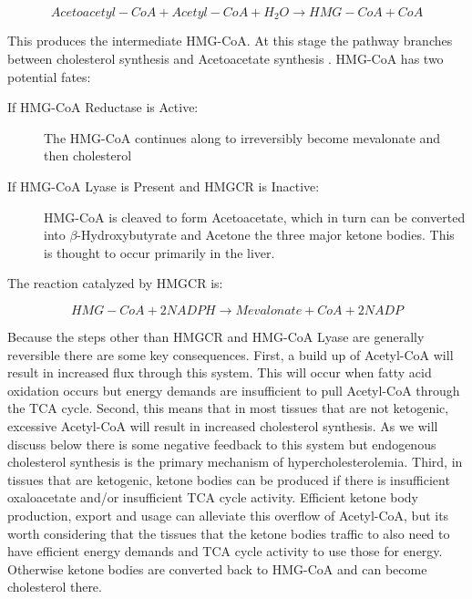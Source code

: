\documentclass{tufte-handout}
\begin{document}
\begin{equation}\label{eq:hmgcs}
Acetoacetyl-CoA + Acetyl-CoA + H_2O \rightarrow HMG-CoA + CoA
\end{equation}

This produces the intermediate HMG-CoA.  At this stage the pathway branches between cholesterol synthesis and Acetoacetate synthesis .  HMG-CoA has two potential fates:
\begin{description}
\item [If HMG-CoA Reductase is Active:] The HMG-CoA continues along to irreversibly become mevalonate and then cholesterol
\item [If HMG-CoA Lyase is Present and HMGCR is Inactive:] HMG-CoA is cleaved to form Acetoacetate, which in turn can be converted into $\beta$-Hydroxybutyrate and Acetone the three major ketone bodies.  This is thought to occur primarily in the liver.
\end{description}

The reaction catalyzed by HMGCR is:

\begin{equation}\label{eq:hmgcs}
HMG-CoA + 2NADPH \rightarrow Mevalonate + CoA + 2NADP
\end{equation}

 Because the steps other than HMGCR and HMG-CoA Lyase are generally reversible there are some key consequences.  First, a build up of Acetyl-CoA will result in increased flux through this system.  This will occur when fatty acid oxidation occurs but energy demands are insufficient to pull Acetyl-CoA through the TCA cycle.  Second, this means that in most tissues that are not ketogenic, excessive Acetyl-CoA will result in increased cholesterol synthesis.  As we will discuss below there is some negative feedback to this system but endogenous cholesterol synthesis is the primary mechanism of hypercholesterolemia.  Third, in tissues that are ketogenic, ketone bodies can be produced if there is insufficient oxaloacetate and/or insufficient TCA cycle activity.  Efficient ketone body production, export and usage can alleviate this overflow of Acetyl-CoA, but its worth considering that the tissues that the ketone bodies traffic to also need to have efficient energy demands and TCA cycle activity to use those for energy.  Otherwise ketone bodies are converted back to HMG-CoA and can become cholesterol there.
\end{document}
